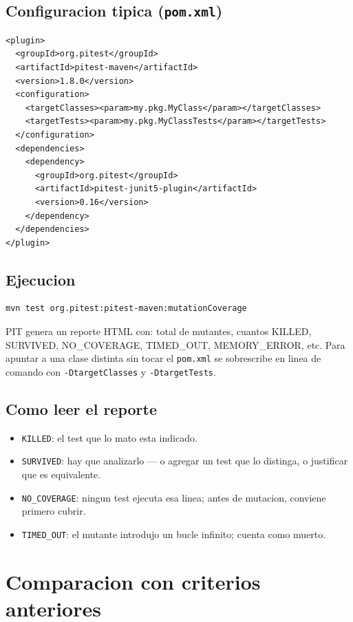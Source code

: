 \documentclass[12pt,a4paper]{article}
\begin{document}
\subsection{Configuracion tipica (\texttt{pom.xml})}

\begin{lstlisting}[style=codestyle]
<plugin>
  <groupId>org.pitest</groupId>
  <artifactId>pitest-maven</artifactId>
  <version>1.8.0</version>
  <configuration>
    <targetClasses><param>my.pkg.MyClass</param></targetClasses>
    <targetTests><param>my.pkg.MyClassTests</param></targetTests>
  </configuration>
  <dependencies>
    <dependency>
      <groupId>org.pitest</groupId>
      <artifactId>pitest-junit5-plugin</artifactId>
      <version>0.16</version>
    </dependency>
  </dependencies>
</plugin>
\end{lstlisting}

\subsection{Ejecucion}

\begin{lstlisting}[style=codestyle]
mvn test org.pitest:pitest-maven:mutationCoverage
\end{lstlisting}

PIT genera un reporte HTML con: total de mutantes, cuantos KILLED, SURVIVED, NO\_COVERAGE,
TIMED\_OUT, MEMORY\_ERROR, etc. Para apuntar a una clase distinta sin tocar el \texttt{pom.xml}
se sobrescribe en linea de comando con \texttt{-DtargetClasses} y \texttt{-DtargetTests}.

\subsection{Como leer el reporte}

\begin{itemize}
  \item \texttt{KILLED}: el test que lo mato esta indicado.
  \item \texttt{SURVIVED}: hay que analizarlo --- o agregar un test que lo distinga, o
  justificar que es equivalente.
  \item \texttt{NO\_COVERAGE}: ningun test ejecuta esa linea; antes de mutacion, conviene
  primero cubrir.
  \item \texttt{TIMED\_OUT}: el mutante introdujo un bucle infinito; cuenta como muerto.
\end{itemize}

\section{Comparacion con criterios anteriores}
\end{document}
